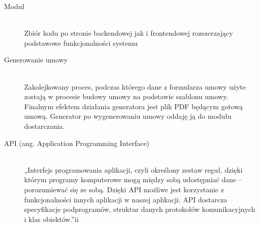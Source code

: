 \begin{description}
    \item[Moduł] \hfill \\ Zbiór kodu po stronie backendowej jak i frontendowej rozszerzający podstawowe funkcjonalności systemu 

    \item[Generowanie umowy] \hfill \\ Zakolejkowany proces, podczas którego dane z formularza umowy użyte zostają w procesie budowy umowy na podstawie szablonu umowy. Finalnym efektem działania generatora jest plik PDF będącym gotową umową. Generator po wygenerowaniu umowy oddaję ją do modułu dostarczania. 

    \item[API (ang. Application Programming Interface)] \hfill \\ „Interfejs programowania aplikacji, czyli określony zestaw reguł, dzięki którym programy komputerowe mogą między sobą udostępniać dane – porozumiewać się ze sobą. Dzięki API możliwe jest korzystanie z funkcjonalności innych aplikacji w naszej aplikacji. API dostarcza specyfikacje podprogramów, struktur danych protokołów komunikacyjnych i klas obiektów.”ii 
\end{description}